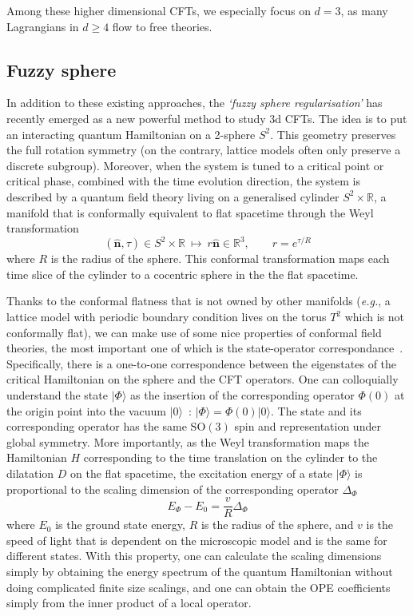 \documentclass{timesjhep}
\begin{document}
Among these higher dimensional CFTs, we especially focus on $d=3$, as many Lagrangians in $d\ge 4$ flow to free theories. 

\subsection{Fuzzy sphere}

In addition to these existing approaches, the \textit{`fuzzy sphere regularisation'} has recently emerged as a new powerful method to study 3d CFTs. The idea is to put an interacting quantum Hamiltonian on a 2-sphere $S^2$. This geometry preserves the full rotation symmetry (on the contrary, lattice models often only preserve a discrete subgroup). Moreover, when the system is tuned to a critical point or critical phase, combined with the time evolution direction, the system is described by a quantum field theory living on a generalised cylinder $S^2\times\mathbb{R}$, a manifold that is conformally equivalent to flat spacetime through the Weyl transformation
\begin{equation}
    (\hat{\mathbf{n}},\tau)\in S^2\times\mathbb{R}\ \longmapsto\ r\hat{\mathbf{n}}\in\mathbb{R}^3,\qquad r=e^{\tau/R}
\end{equation}
where $R$ is the radius of the sphere. This conformal transformation maps each time slice of the cylinder to a cocentric sphere in the the flat spacetime. 

Thanks to the conformal flatness that is not owned by other manifolds (\textit{e.g.}, a lattice model with periodic boundary condition lives on the torus $T^2$ which is not conformally flat), we can make use of some nice properties of conformal field theories, the most important one of which is the state-operator correspondance~\cite{Pappadopulo2012Radial,Rychkov2016CFT,SimmonsDuffin2016CFT}. Specifically, there is a one-to-one correspondence between the eigenstates of the critical Hamiltonian on the sphere and the CFT operators. One can colloquially understand the state $|\Phi\rangle$ as the insertion of the corresponding operator $\Phi(0)$ at the origin point into the vacuum $|0\rangle$~: $|\Phi\rangle=\Phi(0)|0\rangle$. The state and its corresponding operator has the same $\mathrm{SO}(3)$ spin and representation under global symmetry. More importantly, as the Weyl transformation maps the Hamiltonian $H$ corresponding to the time translation on the cylinder to the dilatation $D$ on the flat spacetime, the excitation energy of a state $|\Phi\rangle$ is proportional to the scaling dimension of the corresponding operator $\Delta_\Phi$ 
\begin{equation}
    E_\Phi-E_0=\frac{v}{R}\Delta_\Phi
\end{equation}
where $E_0$ is the ground state energy, $R$ is the radius of the sphere, and $v$ is the speed of light that is dependent on the microscopic model and is the same for different states. With this property, one can calculate the scaling dimensions simply by obtaining the energy spectrum of the quantum Hamiltonian without doing complicated finite size scalings, and one can obtain the OPE coefficients simply from the inner product of a local operator. 
\end{document}
